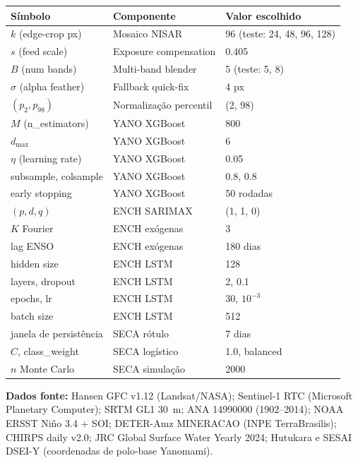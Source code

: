 \documentclass[10pt,a4paper]{article}
\begin{document}
\begin{center}
\small
\begin{tabular}{lll}
\toprule
Símbolo & Componente & Valor escolhido \\
\midrule
$k$ (edge-crop px) & Mosaico NISAR & 96 (teste: 24, 48, 96, 128) \\
$s$ (feed scale) & Exposure compensation & 0.405 \\
$B$ (num bands) & Multi-band blender & 5 (teste: 5, 8) \\
$\sigma$ (alpha feather) & Fallback quick-fix & 4 px \\
$(p_2, p_{98})$ & Normalização percentil & (2, 98) \\
$M$ (n\_estimators) & YANO XGBoost & 800 \\
$d_{\max}$ & YANO XGBoost & 6 \\
$\eta$ (learning rate) & YANO XGBoost & 0.05 \\
subsample, colsample & YANO XGBoost & 0.8, 0.8 \\
early stopping & YANO XGBoost & 50 rodadas \\
$(p,d,q)$ & ENCH SARIMAX & (1, 1, 0) \\
$K$ Fourier & ENCH exógenas & 3 \\
lag ENSO & ENCH exógenas & 180 dias \\
hidden size & ENCH LSTM & 128 \\
layers, dropout & ENCH LSTM & 2, 0.1 \\
epochs, lr & ENCH LSTM & 30, $10^{-3}$ \\
batch size & ENCH LSTM & 512 \\
janela de persistência & SECA rótulo & 7 dias \\
$C$, class\_weight & SECA logístico & 1.0, balanced \\
$n$ Monte Carlo & SECA simulação & 2000 \\
\bottomrule
\end{tabular}
\end{center}

\vspace{0.5em}
\footnotesize
\textbf{Dados fonte:} Hansen GFC v1.12 (Landsat/NASA); Sentinel-1 RTC
(Microsoft Planetary Computer); SRTM GL1 30~m; ANA 14990000 (1902–2014);
NOAA ERSST Niño 3.4 + SOI; DETER-Amz MINERACAO (INPE TerraBrasilis); CHIRPS
daily v2.0; JRC Global Surface Water Yearly 2024; Hutukara e SESAI DSEI-Y
(coordenadas de polo-base Yanomami).
\end{document}
